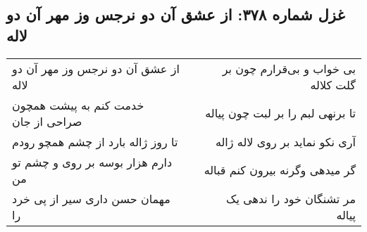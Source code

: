\begin{center}
\section*{غزل شماره ۳۷۸: از عشق آن دو نرجس وز مهر آن دو لاله}
\label{sec:378}
\begin{longtable}{l p{0.5cm} r}
از عشق آن دو نرجس وز مهر آن دو لاله
&&
بی خواب و بی‌قرارم چون بر گلت کلاله
\\
خدمت کنم به پیشت همچون صراحی از جان
&&
تا برنهی لبم را بر لبت چون پیاله
\\
تا روز ژاله بارد از چشم همچو رودم
&&
آری نکو نماید بر روی لاله ژاله
\\
دارم هزار بوسه بر روی و چشم تو من
&&
گر میدهی وگرنه بیرون کنم قباله
\\
مهمان حسن داری سیر از پی خرد را
&&
مر تشنگان خود را ندهی یک پیاله
\\
\end{longtable}
\end{center}
